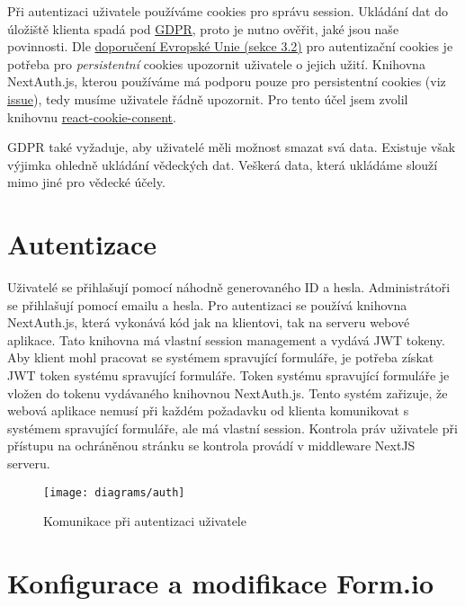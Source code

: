 Při autentizaci uživatele používáme cookies pro správu session.
Ukládání dat do úložiště klienta spadá pod \href{https://eur-lex.europa.eu/eli/reg/2016/679/oj}{GDPR}, proto je nutno ověřit, jaké jsou naše povinnosti.
Dle \href{https://ec.europa.eu/justice/article-29/documentation/opinion-recommendation/files/2012/wp194_en.pdf}{doporučení Evropské Unie (sekce 3.2)} pro autentizační cookies je potřeba pro \emph{persistentní} cookies upozornit uživatele o jejich užití.
Knihovna NextAuth.js, kterou používáme má podporu pouze pro persistentní cookies (viz \href{https://github.com/nextauthjs/next-auth/issues/2534}{issue}), tedy musíme uživatele řádně upozornit.
Pro tento účel jsem zvolil knihovnu \href{https://www.npmjs.com/package/react-cookie-consent}{react-cookie-consent}.

GDPR také vyžaduje, aby uživatelé měli možnost smazat svá data.
Existuje však výjimka ohledně ukládání vědeckých dat.
Veškerá data, která ukládáme slouží mimo jiné pro vědecké účely.


\section{Autentizace}\label{sec:auth}

Uživatelé se přihlašují pomocí náhodně generovaného ID a hesla.
Administrátoři se přihlašují pomocí emailu a hesla.
Pro autentizaci se používá knihovna NextAuth.js, která vykonává kód jak na klientovi, tak na serveru webové aplikace.
Tato knihovna má vlastní session management a vydává JWT tokeny.
Aby klient mohl pracovat se systémem spravující formuláře, je potřeba získat JWT token systému spravující formuláře.
Token systému spravující formuláře je vložen do tokenu vydávaného knihovnou NextAuth.js.
Tento systém zařizuje, že webová aplikace nemusí při každém požadavku od klienta komunikovat s systémem spravující formuláře, ale má vlastní session.
Kontrola práv uživatele při přístupu na ochráněnou stránku se kontrola provádí v middleware NextJS serveru.

\begin{figure}[H]
    \texttt{[image: diagrams/auth]}
    \caption{Komunikace při autentizaci uživatele}\label{fig:auth}
\end{figure}


\section{Konfigurace a modifikace Form.io}\label{sec:konfigurace-a-modifikace-form.io}

